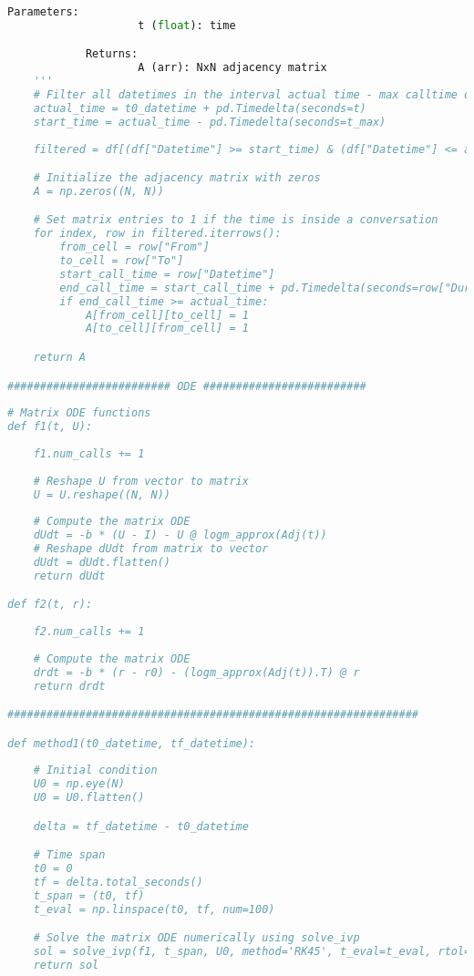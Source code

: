 \begin{lstlisting}[language=Python, caption=Broadcast - Receive centrality comparison]
            Parameters:
                    t (float): time

            Returns:
                    A (arr): NxN adjacency matrix
    '''
    # Filter all datetimes in the interval actual time - max calltime duration
    actual_time = t0_datetime + pd.Timedelta(seconds=t)
    start_time = actual_time - pd.Timedelta(seconds=t_max)
    
    filtered = df[(df["Datetime"] >= start_time) & (df["Datetime"] <= actual_time)]

    # Initialize the adjacency matrix with zeros
    A = np.zeros((N, N))

    # Set matrix entries to 1 if the time is inside a conversation
    for index, row in filtered.iterrows():
        from_cell = row["From"]
        to_cell = row["To"]
        start_call_time = row["Datetime"]
        end_call_time = start_call_time + pd.Timedelta(seconds=row["Duration(seconds)"])
        if end_call_time >= actual_time:
            A[from_cell][to_cell] = 1
            A[to_cell][from_cell] = 1

    return A

######################### ODE #########################
    
# Matrix ODE functions
def f1(t, U):
    
    f1.num_calls += 1
    
    # Reshape U from vector to matrix
    U = U.reshape((N, N))
    
    # Compute the matrix ODE
    dUdt = -b * (U - I) - U @ logm_approx(Adj(t))
    # Reshape dUdt from matrix to vector
    dUdt = dUdt.flatten()
    return dUdt

def f2(t, r):
    
    f2.num_calls += 1
    
    # Compute the matrix ODE
    drdt = -b * (r - r0) - (logm_approx(Adj(t)).T) @ r
    return drdt

###############################################################

def method1(t0_datetime, tf_datetime):
    
    # Initial condition 
    U0 = np.eye(N)
    U0 = U0.flatten()

    delta = tf_datetime - t0_datetime

    # Time span
    t0 = 0
    tf = delta.total_seconds() 
    t_span = (t0, tf) 
    t_eval = np.linspace(t0, tf, num=100)

    # Solve the matrix ODE numerically using solve_ivp
    sol = solve_ivp(f1, t_span, U0, method='RK45', t_eval=t_eval, rtol=1e-4, atol=1e-4)
    return sol



\end{lstlisting}
